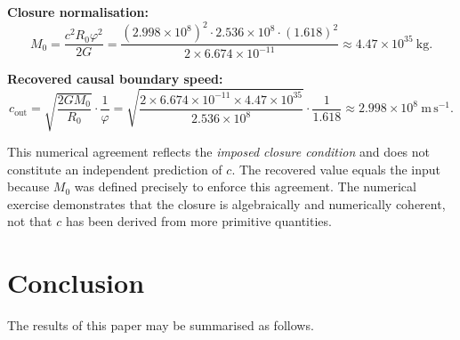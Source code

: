 \documentclass[11pt,a4paper]{article}
\newcommand{\Rzero}{R_0}
\newcommand{\Mzero}{M_0}
\newcommand{\ph}{\varphi}
\begin{document}
\bigskip
\noindent\textbf{Closure normalisation:}
\[
  \Mzero = \frac{c^2\Rzero\ph^2}{2G}
  = \frac{(2.998\times10^8)^2\cdot 2.536\times10^8\cdot(1.618)^2}
         {2\times6.674\times10^{-11}}
  \approx 4.47\times10^{35}\ \mathrm{kg}.
\]

\noindent\textbf{Recovered causal boundary speed:}
\[
  c_{\mathrm{out}}
  = \sqrt{\frac{2G\Mzero}{\Rzero}}\cdot\frac{1}{\ph}
  = \sqrt{\frac{2\times6.674\times10^{-11}\times4.47\times10^{35}}
               {2.536\times10^8}}
    \cdot\frac{1}{1.618}
  \approx 2.998\times10^{8}\ \mathrm{m\,s^{-1}}.
\]

\begin{notebox}
This numerical agreement reflects the \emph{imposed closure condition} and does not
constitute an independent prediction of $c$. The recovered value equals the input
because $\Mzero$ was defined precisely to enforce this agreement. The numerical
exercise demonstrates that the closure is algebraically and numerically coherent,
not that $c$ has been derived from more primitive quantities.
\end{notebox}

\section{Conclusion}

The results of this paper may be summarised as follows.
\end{document}
